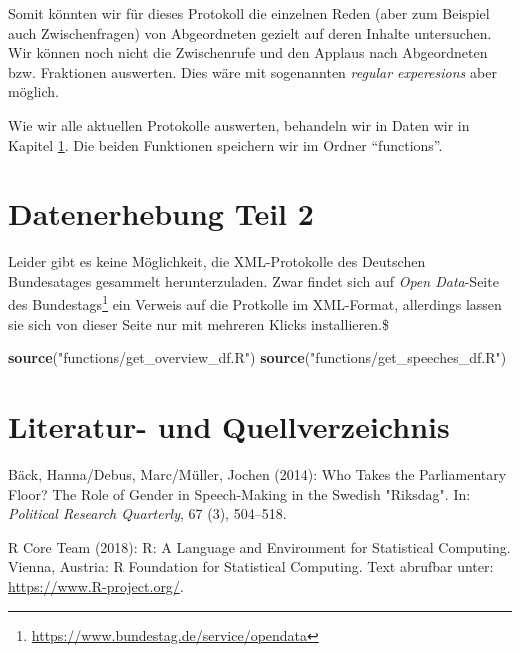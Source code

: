 \documentclass[oneside, 12pt]{scrbook}
\newenvironment{Shaded}{\begin{snugshade}}{\end{snugshade}}
\newcommand{\KeywordTok}[1]{\textcolor[rgb]{0.13,0.29,0.53}{\textbf{#1}}}
\newcommand{\NormalTok}[1]{#1}
\newcommand{\StringTok}[1]{\textcolor[rgb]{0.31,0.60,0.02}{#1}}
\theoremstyle{definition}
\theoremstyle{definition}
\theoremstyle{definition}
\theoremstyle{remark}
\begin{document}
Somit könnten wir für dieses Protokoll die einzelnen Reden (aber zum
Beispiel auch Zwischenfragen) von Abgeordneten gezielt auf deren Inhalte
untersuchen. Wir können noch nicht die Zwischenrufe und den Applaus nach
Abgeordneten bzw. Fraktionen auswerten. Dies wäre mit sogenannten
\emph{regular experesions} aber möglich.

Wie wir alle aktuellen Protokolle auswerten, behandeln wir in Daten wir
in Kapitel \ref{data-02}. Die beiden Funktionen speichern wir im Ordner
``functions''.

\hypertarget{data-02}{%
\chapter{Datenerhebung Teil 2}\label{data-02}}

Leider gibt es keine Möglichkeit, die XML-Protokolle des Deutschen
Bundesatages gesammelt herunterzuladen. Zwar findet sich auf \emph{Open
Data}-Seite des Bundestags\footnote{\url{https://www.bundestag.de/service/opendata}}
ein Verweis auf die Protkolle im XML-Format, allerdings lassen sie sich
von dieser Seite nur mit mehreren Klicks installieren.\$

\begin{Shaded}
\begin{Highlighting}[]
\KeywordTok{source}\NormalTok{(}\StringTok{"functions/get_overview_df.R"}\NormalTok{)}
\KeywordTok{source}\NormalTok{(}\StringTok{"functions/get_speeches_df.R"}\NormalTok{)}
\end{Highlighting}
\end{Shaded}

\hypertarget{literatur--und-quellverzeichnis}{%
\chapter*{Literatur- und
Quellverzeichnis}\label{literatur--und-quellverzeichnis}}

\hypertarget{refs}{}
\leavevmode\hypertarget{ref-back_2014}{}%
Bäck, Hanna/Debus, Marc/Müller, Jochen (2014): Who Takes the
Parliamentary Floor? The Role of Gender in Speech-Making in the Swedish
"Riksdag". In: \emph{Political Research Quarterly}, 67 (3), 504--518.

\leavevmode\hypertarget{ref-rcoreteam_2018}{}%
R Core Team (2018): R: A Language and Environment for Statistical
Computing. Vienna, Austria: R Foundation for Statistical Computing. Text
abrufbar unter: \url{https://www.R-project.org/}.
\end{document}
